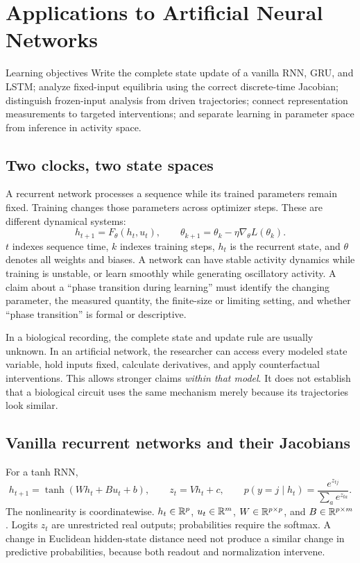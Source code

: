 \chapter{Applications to Artificial Neural Networks}\label{ch:10}

\begin{insight}{Learning objectives}
Write the complete state update of a vanilla RNN, GRU, and LSTM; analyze fixed-input equilibria using the correct discrete-time Jacobian; distinguish frozen-input analysis from driven trajectories; connect representation measurements to targeted interventions; and separate learning in parameter space from inference in activity space.
\end{insight}

\section{Two clocks, two state spaces}
A recurrent network processes a sequence while its trained parameters remain fixed. Training changes those parameters across optimizer steps. These are different dynamical systems:
\begin{equation}
 h_{t+1}=F_{\theta}(h_t,u_t),\qquad
 \theta_{k+1}=\theta_k-\eta\nabla_\theta L(\theta_k).
 \label{eq:10-two-times}
\end{equation}
$t$ indexes sequence time, $k$ indexes training steps, $h_t$ is the recurrent state, and $\theta$ denotes all weights and biases. A network can have stable activity dynamics while training is unstable, or learn smoothly while generating oscillatory activity. A claim about a ``phase transition during learning'' must identify the changing parameter, the measured quantity, the finite-size or limiting setting, and whether ``phase transition'' is formal or descriptive.

In a biological recording, the complete state and update rule are usually unknown. In an artificial network, the researcher can access every modeled state variable, hold inputs fixed, calculate derivatives, and apply counterfactual interventions. This allows stronger claims \emph{within that model}. It does not establish that a biological circuit uses the same mechanism merely because its trajectories look similar.

\section{Vanilla recurrent networks and their Jacobians}
For a tanh RNN,
\begin{equation}
 h_{t+1}=\tanh(Wh_t+Bu_t+b),\qquad
 z_t=Vh_t+c,\qquad
 p(y=j\mid h_t)=\frac{e^{z_{tj}}}{\sum_a e^{z_{ta}}}.
 \label{eq:10-rnn}
\end{equation}
The nonlinearity is coordinatewise. $h_t\in\mathbb{R}^p$, $u_t\in\mathbb{R}^m$, $W\in\mathbb{R}^{p\times p}$, and $B\in\mathbb{R}^{p\times m}$. Logits $z_t$ are unrestricted real outputs; probabilities require the softmax. A change in Euclidean hidden-state distance need not produce a similar change in predictive probabilities, because both readout and normalization intervene.

